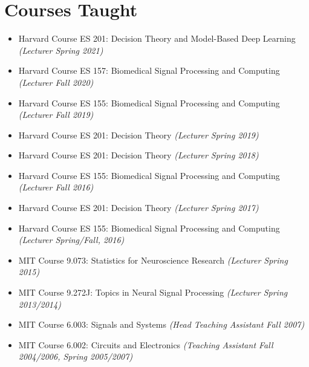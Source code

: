 \section*{Courses Taught}

  \begin{itemize}
  	  \item Harvard Course ES 201: Decision Theory and Model-Based Deep Learning \emph{(Lecturer Spring 2021)}  
  	  \item Harvard Course ES 157: Biomedical Signal Processing and Computing \emph{(Lecturer Fall 2020)}  
  	  \item Harvard Course ES 155: Biomedical Signal Processing and Computing \emph{(Lecturer Fall 2019)}
  	  \item Harvard Course ES 201: Decision Theory \emph{(Lecturer Spring 2019)}
    	  \item Harvard Course ES 201: Decision Theory \emph{(Lecturer Spring 2018)}
   	  \item Harvard Course ES 155: Biomedical Signal Processing and Computing \emph{(Lecturer Fall 2016)}
  	  \item Harvard Course ES 201: Decision Theory \emph{(Lecturer Spring 2017)}
   	  \item Harvard Course ES 155: Biomedical Signal Processing and Computing \emph{(Lecturer Spring/Fall, 2016)}
      \item MIT Course 9.073: Statistics for Neuroscience Research \emph{(Lecturer Spring 2015)}
      \item MIT Course 9.272J: Topics in Neural Signal Processing \emph{(Lecturer Spring 2013/2014)}
      \item MIT Course 6.003: Signals and Systems \emph{(Head Teaching Assistant Fall 2007)}
      \item MIT Course 6.002: Circuits and Electronics \emph{(Teaching Assistant Fall 2004/2006, Spring 2005/2007)}
  \end{itemize}

